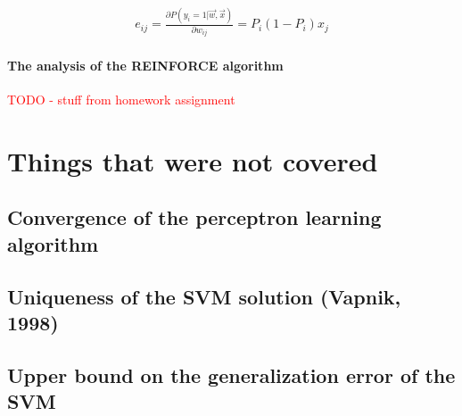 \documentclass[11pt]{book} %
\begin{document}
\begin{align*}
    e_{ij} = \frac{\partial P(y_i = 1 | \vec{w}, \vec{x})}{\partial w_{ij}} = P_i (1 - P_i) x_j
\end{align*}

\subsubsection{The analysis of the REINFORCE algorithm}
\textcolor{red}{TODO - stuff from homework assignment}

%
%
%
%
%
%
%
%
%
%
%
%
%
%
%
%

\chapter{Things that were not covered}

\section{Convergence of the perceptron learning algorithm}

\section{Uniqueness of the SVM solution (Vapnik, 1998)}

\section{Upper bound on the generalization error of the SVM}

\backmatter
\end{document}
